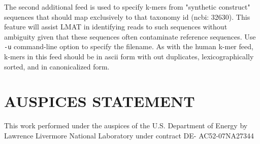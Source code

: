 \documentclass[11pt]{article}
\begin{document}
The second additional feed is used to specify k-mers from "synthetic construct" sequences that should map exclusively to that taxonomy id (ncbi: 32630).  This feature will assist LMAT in identifying reads to such sequences without ambiguity given that these sequences often contaminate reference sequences.  Use \texttt{-u} command-line option to specify the filename.  As with the human k-mer feed, k-mers in this feed should be in ascii form with out duplicates, lexicographically sorted, and in canonicalized form.

\section{AUSPICES STATEMENT}

This work performed under the auspices of the U.S. Department of
Energy by Lawrence Livermore National Laboratory under contract DE-
AC52-07NA27344
\end{document}
